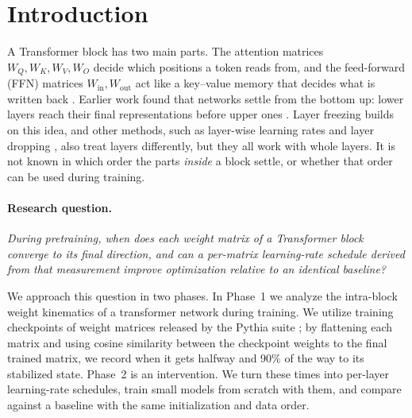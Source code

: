 \documentclass[11pt]{article}
\newcommand{\Wq}{W_Q}
\newcommand{\Wk}{W_K}
\newcommand{\Wv}{W_V}
\newcommand{\Wo}{W_O}
\newcommand{\Win}{W_{\mathrm{in}}}
\newcommand{\Wout}{W_{\mathrm{out}}}
\begin{document}
\section{Introduction}

A Transformer block has two main parts. The attention matrices
$\Wq, \Wk, \Wv, \Wo$ decide which positions a token reads from, and the
feed-forward (FFN) matrices $\Win, \Wout$ act like a key--value memory that
decides what is written back
\citep{vaswani2017attention,geva2021kv,meng2022rome}. Earlier work found that
networks settle from the bottom up: lower layers reach their final
representations before upper ones \citep{raghu2017svcca,chen2023which}.
Layer freezing \citep{brock2017freezeout,liu2021autofreeze} builds on this
idea, and other methods, such as layer-wise learning rates
\citep{howard2018ulmfit} and layer dropping \citep{zhang2020pld}, also treat
layers differently, but they all work with whole layers. It is not known in which order the parts
\emph{inside} a block settle, or whether that order can be used during
training.

\paragraph{Research question.} \emph{During pretraining, when does each weight
matrix of a Transformer block converge to its final direction, and can a
per-matrix learning-rate schedule derived from that measurement improve
optimization relative to an identical baseline?}

We approach this question in two phases.
In Phase~1 we analyze the intra-block weight kinematics of a transformer network during training. We utilize training checkpoints of weight matrices released by the Pythia suite \citep{biderman2023pythia}; by flattening each matrix and using cosine similarity between the checkpoint weights to the final trained matrix, we record when it gets halfway and 90\% of the way
to its stabilized state. Phase~2 is an intervention. We turn these times into per-layer
learning-rate schedules, train small models from scratch with them, and
compare against a baseline with the same initialization and data order.
\end{document}
